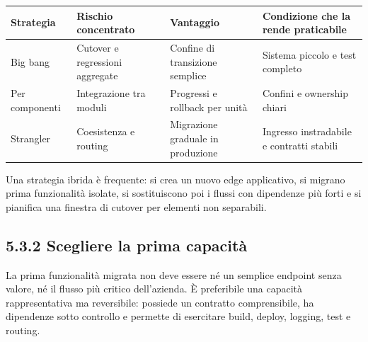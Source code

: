 \documentclass[
  italian,
  10pt,
]{book}
\newcounter{none} %
\begin{document}
{\def\LTcaptype{none} %
\begin{longtable}[]{@{}
  >{\raggedright\arraybackslash}p{}
  >{\raggedright\arraybackslash}p{}
  >{\raggedright\arraybackslash}p{}
  >{\raggedright\arraybackslash}p{}@{}}
\toprule\noalign{}
\begin{minipage}[b]{\linewidth}\raggedright
Strategia
\end{minipage} & \begin{minipage}[b]{\linewidth}\raggedright
Rischio concentrato
\end{minipage} & \begin{minipage}[b]{\linewidth}\raggedright
Vantaggio
\end{minipage} & \begin{minipage}[b]{\linewidth}\raggedright
Condizione che la rende praticabile
\end{minipage} \\
\midrule\noalign{}
\endhead
\bottomrule\noalign{}
\endlastfoot
Big bang & Cutover e regressioni aggregate & Confine di transizione
semplice & Sistema piccolo e test completo \\
Per componenti & Integrazione tra moduli & Progressi e rollback per
unità & Confini e ownership chiari \\
Strangler & Coesistenza e routing & Migrazione graduale in produzione &
Ingresso instradabile e contratti stabili \\
\end{longtable}
}

Una strategia ibrida è frequente: si crea un nuovo edge applicativo, si
migrano prima funzionalità isolate, si sostituiscono poi i flussi con
dipendenze più forti e si pianifica una finestra di cutover per elementi
non separabili.

\subsection{5.3.2 Scegliere la prima
capacità}\label{scegliere-la-prima-capacituxe0}

La prima funzionalità migrata non deve essere né un semplice endpoint
senza valore, né il flusso più critico dell'azienda. È preferibile una
capacità rappresentativa ma reversibile: possiede un contratto
comprensibile, ha dipendenze sotto controllo e permette di esercitare
build, deploy, logging, test e routing.
\end{document}
